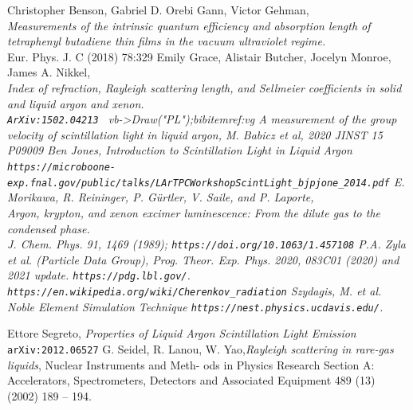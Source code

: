 \documentclass{article}
\begin{document}
\begin{thebibliography}{99}
 Christopher Benson, Gabriel D. Orebi Gann, Victor Gehman,\\
  {\it Measurements of the intrinsic quantum efficiency and absorption
      length of tetraphenyl butadiene thin films in the vacuum
      ultraviolet regime.}\\
Eur. Phys. J. C (2018) 78:329
Emily Grace, Alistair Butcher, Jocelyn Monroe, James A. Nikkel,\\
  \it{Index of refraction, Rayleigh scattering length, and Sellmeier coefficients in solid and liquid argon and xenon.}\\
  \verb|ArXiv:1502.04213|
\    vb->Draw("PL");bibitem{ref:vg} 
  \it{A measurement of the group velocity of scintillation light in liquid argon},
  M. Babicz et al, 2020 JINST 15 P09009
  Ben Jones, \it{Introduction to Scintillation Light in Liquid Argon}
  \verb|https://microboone-exp.fnal.gov/public/talks/LArTPCWorkshopScintLight_bjpjone_2014.pdf|
  E. Morikawa, R. Reininger, P. Gürtler, V. Saile, and P. Laporte,\\
\it{Argon, krypton, and xenon excimer luminescence: From the dilute gas to the
condensed phase.}\\
J. Chem. Phys. 91, 1469 (1989);
  \verb|https://doi.org/10.1063/1.457108|
P.A. Zyla et al. (Particle Data Group), Prog. Theor. Exp. Phys. 2020, 083C01 (2020) and 2021 update.
\verb|https://pdg.lbl.gov/|.
  \verb|https://en.wikipedia.org/wiki/Cherenkov_radiation|
  Szydagis, M. et al. {\it Noble Element Simulation Technique}
  \verb|https://nest.physics.ucdavis.edu/|.

  Ettore Segreto, {\it Properties of Liquid Argon Scintillation Light Emission}
  \verb|arXiv:2012.06527|
  G. Seidel, R. Lanou, W. Yao,{\it  Rayleigh scattering in rare-gas liquids}, Nuclear Instruments and Meth-
ods in Physics Research Section A: Accelerators, Spectrometers, Detectors and Associated Equipment
489 (13) (2002) 189 – 194.
  
\end{thebibliography}
\end{document}
